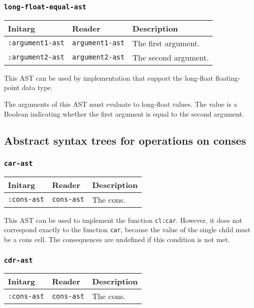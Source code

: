 \subsubsection{\texttt{long-float-equal-ast}}
\label{sec-ast-long-float-equal}

\begin{tabular}{|l|l|l|}
\hline
Initarg & Reader & Description\\
\hline\hline
\texttt{:argument1-ast} & \texttt{argument1-ast} & The first argument.\\
\hline
\texttt{:argument2-ast} & \texttt{argument2-ast} & The second argument.\\
\hline
\end{tabular}

This AST can be used by implementation that support the long-float
floating-point data type.  

The arguments of this AST must evaluate to long-float
values.  The value is a Boolean indicating whether the first argument
is equal to the second argument.

\subsection{Abstract syntax trees for operations on conses}

\subsubsection{\texttt{car-ast}}
\label{sec-ast-car}

\begin{tabular}{|l|l|l|}
  \hline
  Initarg & Reader & Description\\
  \hline\hline
  \texttt{:cons-ast} & \texttt{cons-ast} & The cons.\\
  \hline
\end{tabular}

This AST can be used to implement the function \texttt{cl:car}. However,
it does not correspond exactly to the function \texttt{car}, because
the value of the single child must be a cons cell. The consequences
are undefined if this condition is not met.

\subsubsection{\texttt{cdr-ast}}
\label{sec-ast-cdr}

\begin{tabular}{|l|l|l|}
  \hline
  Initarg & Reader & Description\\
  \hline\hline
  \texttt{:cons-ast} & \texttt{cons-ast} & The cons.\\
  \hline
\end{tabular}

